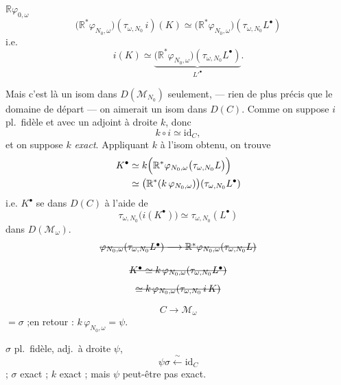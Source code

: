 \documentclass[11pt,a4paper]{article}
\begin{document}
 $\mathbb{R}\varphi_{0,\omega}$
\[
\bigl(\mathbb{R}^{*}\varphi_{N_0,\omega}\bigr)(\tau_{\omega,N_0}\,i)(K) \simeq \bigl(\mathbb{R}^{*}\varphi_{N_0,\omega}\bigr)(\tau_{\omega,N_0}L^{\bullet})
\]
i.e.
\[
i(K) \simeq \underbrace{\bigl(\mathbb{R}^{*}\varphi_{N_0,\omega}\bigr)(\tau_{\omega,N_0}L^{\bullet})}_{L'^{\bullet}}.
\]

Mais c'est là un isom dans $D(\mathcal{M}_{N_0})$ seulement, — rien de plus précis que le domaine de départ — on aimerait un isom dans $D(C)$. Comme on suppose $i$ pl.\ fidèle et avec un adjoint à droite $k$, donc
\[
k\circ i \simeq \mathrm{id}_C,
\]
et on suppose $k$ \emph{exact}. Appliquant $k$ à l'isom obtenu, on trouve
\[
\begin{aligned}
K^{\bullet} &\simeq k\Bigl(\mathbb{R}^{*}\varphi_{N_0,\omega}\bigl(\tau_{\omega,N_0}L\bigr)\Bigr)\\
&\simeq \bigl(\mathbb{R}^{*}(k\,\varphi_{N_0,\omega})\bigr)(\tau_{\omega,N_0}L^{\bullet})
\end{aligned}
\]
i.e. $K^{\bullet}$ se  dans $D(C)$ à l'aide de
\[
\tau_{\omega,N_0}\bigl(i(K^{\bullet})\bigr) \simeq \tau_{\omega,N_0}(L^{\bullet})
\]
dans $D(\mathcal{M}_\omega)$.
\[
\text{\struck{$\varphi_{N_0,\omega}(\tau_{\omega,N_0}L^{\bullet}) \longrightarrow \mathbb{R}^{*}\varphi_{N_0,\omega}(\tau_{\omega,N_0}L)$}}
\]

\[
\text{\struck{$K^{\bullet} \simeq k\,\varphi_{N_0,\omega}(\tau_{\omega,N_0}L^{\bullet})$}}
\]
\[
\text{\struck{$\simeq k\,\varphi_{N_0,\omega}(\tau_{\omega,N_0}\,i\,K)$}}
\]

\[
C \longrightarrow \mathcal{M}_\omega
\]
\ill{} $= \sigma$ ;\quad en retour : $k\,\varphi_{N_0,\omega} = \psi$.

$\sigma$ pl.\ fidèle, adj.\ à droite $\psi$,
\[
\psi\sigma \xleftarrow{\;\sim\;} \mathrm{id}_C
\]
 ; $\sigma$ exact ; $k$ exact ; mais $\psi$ peut-être pas exact.
\end{document}
